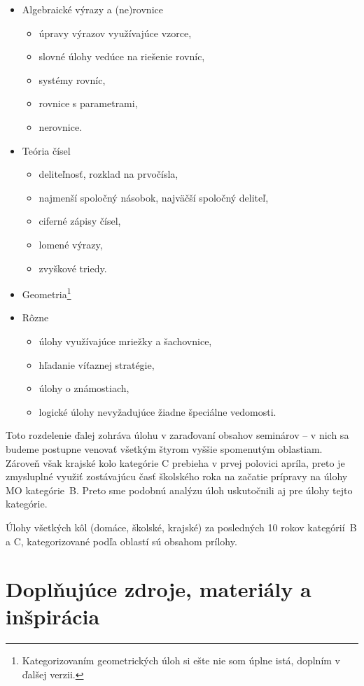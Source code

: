 \documentclass[11pt,a4paper,oneside,final]{book}
\begin{document}
\begin{itemize}
\item Algebraické výrazy a (ne)rovnice
\begin{itemize}
\item úpravy výrazov využívajúce vzorce,
\item slovné úlohy vedúce na riešenie rovníc,
\item systémy rovníc,
\item rovnice s parametrami,
\item nerovnice.
\end{itemize}
\item Teória čísel
\begin{itemize}
\item deliteľnosť, rozklad na prvočísla,
\item najmenší spoločný násobok, najväčší spoločný deliteľ,
\item ciferné zápisy čísel,
\item lomené výrazy,
\item zvyškové triedy.
\end{itemize}
\item Geometria\footnote{Kategorizovaním geometrických úloh si ešte nie som úplne istá, doplním v ďalšej verzii.}
\item Rôzne
\begin{itemize}
\item úlohy využívajúce mriežky a šachovnice,
\item hľadanie víťaznej stratégie,
\item úlohy o známostiach,
\item logické úlohy nevyžadujúce žiadne špeciálne vedomosti.
\end{itemize}
\end{itemize}

Toto rozdelenie ďalej zohráva úlohu v zaraďovaní obsahov seminárov -- v nich sa budeme postupne venovať všetkým štyrom vyššie spomenutým oblastiam. Zároveň však krajské kolo kategórie C prebieha v prvej polovici apríla, preto je zmysluplné využiť zostávajúcu časť školského roka na začatie prípravy na úlohy MO kategórie~B. Preto sme podobnú analýzu úloh uskutočnili aj pre úlohy tejto kategórie.

Úlohy všetkých kôl (domáce, školské, krajské) za posledných 10 rokov kategórií~B a C, kategorizované podľa oblastí sú obsahom prílohy.

\section{Doplňujúce zdroje, materiály a inšpirácia}
\end{document}
